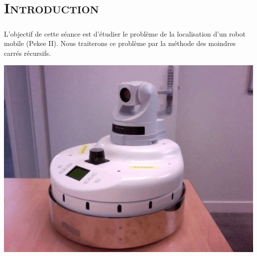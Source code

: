 \chapter*{\textsc{Introduction}}

	\paragraph{}
	L'objectif de cette séance est d'étudier le problème de la localisation d'un robot mobile (Pekee II). Nous traiterons ce problème par la méthode des moindres carrés récursifs.
	
	\begin{center}
	\includegraphics[scale=0.5]{pekee.png}
	\label{fig1} 
	\end{center}   
	